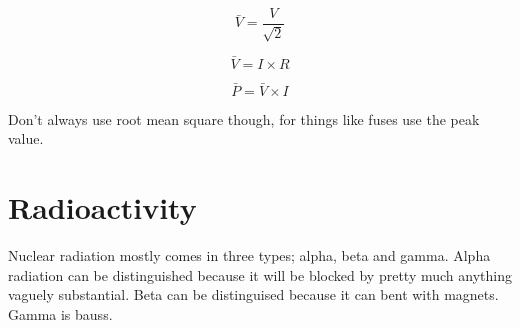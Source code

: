 \documentclass{article}
\begin{document}
\[\bar{V} = \frac{V}{\sqrt{2}}\]


\[\bar{V} = I \times R\]

\[\bar{P} = \bar{V} \times I\]

Don't always use root mean square though, for things like fuses use the peak
value.

\section{Radioactivity}

Nuclear radiation mostly comes in three types; alpha, beta and gamma. Alpha
radiation can be distinguished because it will be blocked by pretty much
anything vaguely substantial. Beta can be distinguised because it can bent with
magnets. Gamma is bauss.
\end{document}
